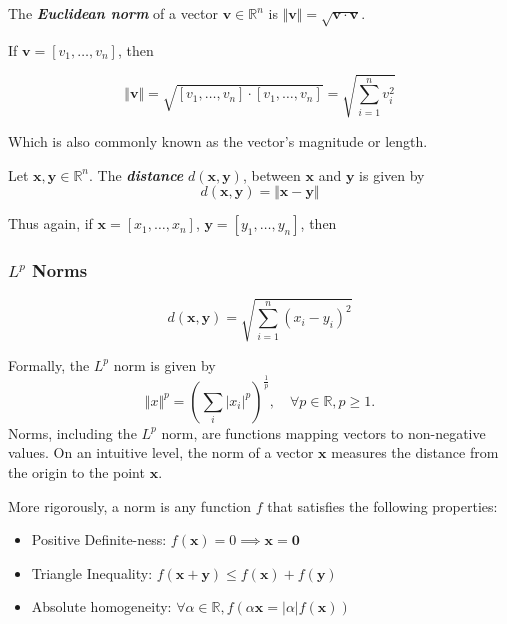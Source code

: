 \documentclass{article}
\begin{document}
\begin{definition}
    The \textbf{\textit{Euclidean norm}} of a vector $\bm{v} \in \mathbb{R}^n$ is $\Vert \bm{v} \Vert = \sqrt{\bm{v} \cdot \bm{v}}$. 
\end{definition}

If $\bm{v} = [v_{1}, \dots, v_n]$, then

\begin{equation}
    \Vert \bm{v} \Vert = \sqrt{[v_{1}, \dots, v_n] \cdot [v_{1}, \dots, v_n]} = \sqrt{\displaystyle \sum_{i=1}^{n} v_i^2}
\end{equation}

Which is also commonly known as the vector's magnitude or length. 

\begin{theorem}
    Let $\bm{x}, \bm{y} \in \mathbb{R}^n$. The \textbf{\textit{distance}} $d(\bm{x}, \bm{y})$, between $\bm{x}$ and $\bm{y}$ is given by
    \begin{equation*}
        d(\bm{x}, \bm{y}) = \Vert \bm{x} - \bm{y} \Vert
    \end{equation*}
\end{theorem}

Thus again, if $\bm{x} = [x_{1}, \dots, x_n]$, $\bm{y} = [y_{1}, \dots, y_n]$, then 


\subsubsection{$L^p$ Norms}
\begin{equation*}
    d(\bm{x}, \bm{y}) = \sqrt{\displaystyle \sum_{i=1}^{n} (x_i - y_i)^{2}}
\end{equation*}

\begin{definition}
    Formally, the $L^p$ norm is given by
    \begin{equation}
        \Vert x \Vert^p = \left(\sum_{i}\vert x_i \vert^p\right)^\frac{1}{p}, \quad \forall p \in \mathbb{R}, p\geq 1.
    \end{equation}
    Norms, including the $L^{p}$ norm, are functions mapping vectors to non-negative values. On an intuitive level, the norm of a vector $\bm{x}$ measures the distance from the origin to the point $\bm{x}$.  
\end{definition}

More rigorously, a norm is any function $f$ that satisfies the following properties:

\begin{itemize}
    \item Positive Definite-ness: $f(\bm{x}) = 0 \implies \bm{x} = \bm{0}$
    \item Triangle Inequality: $f(\bm{x} + \bm{y}) \leq f(\bm{x}) + f(\bm{y})$
    \item Absolute homogeneity: $\forall \alpha \in \mathbb{R}, f(\alpha\bm{x} = \lvert \alpha \rvert f(\bm{x}))$
\end{itemize}
\end{document}
